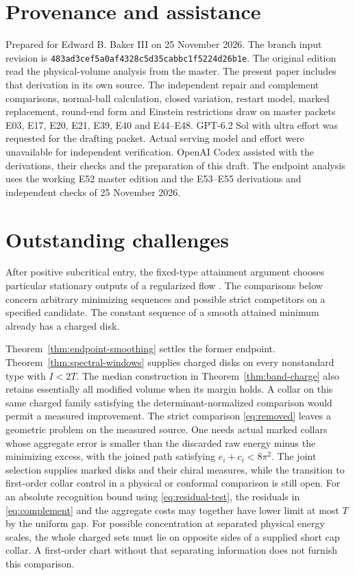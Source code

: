 \documentclass[11pt,letterpaper]{article}
\numberwithin{equation}{section}
\theoremstyle{remark}
\begin{document}




\section*{Provenance and assistance}

Prepared for Edward B. Baker III on 25 November 2026.
The branch input revision is
\texttt{483ad3cef5a0af4328c5d35cabbc1f5224d26b1e}.
The original edition read the physical-volume analysis from the master.
The present paper includes that derivation in its own source. The independent repair and complement comparisons,
normal-ball calculation, closed variation, restart model,
marked replacement, round-end form and Einstein restrictions
draw on master packets E03, E17, E20, E21, E39, E40 and
E44--E48. GPT-6.2 Sol with ultra effort was requested for
the drafting packet. Actual serving model and effort were
unavailable for independent verification. OpenAI Codex
assisted with the derivations, their checks and the preparation
of this draft. The endpoint analysis uses the working E52 master edition and the E53--E55 derivations and independent checks of 25 November 2026.

\section{Outstanding challenges}

After positive subcritical entry, the fixed-type attainment argument
chooses particular stationary outputs of a regularized flow
\cite{Baker2026BourAttainment}. The comparisons below concern
arbitrary minimizing sequences and possible strict competitors on
a specified candidate. The constant sequence of a smooth attained
minimum already has a charged disk.

Theorem~\ref{thm:endpoint-smoothing} settles the former endpoint.
Theorem~\ref{thm:spectral-windows} supplies charged disks on every nonstandard type with
\(I<2T\). The median construction in Theorem~\ref{thm:band-charge}
also retains essentially all modified volume when its margin holds. A collar on this same charged family satisfying the
determinant-normalized comparison would permit a measured improvement.
The strict comparison \eqref{eq:removed} leaves a geometric
problem on the measured source. One needs actual marked collars
whose aggregate error is smaller than the discarded raw energy
minus the minimizing excess, with the joined path satisfying
\(e_i+c_i<8\pi^2\). The joint selection supplies
marked disks and their chiral measures, while the transition to
first-order collar control in a physical or conformal comparison
is still open. For an absolute recognition bound using
\eqref{eq:residual-test}, the residuals in \eqref{eq:complement}
and the aggregate costs may together have lower limit at most \(T\) by the uniform gap.
For possible concentration at separated physical energy scales,
the whole charged sets must lie on opposite sides of a supplied
short cap collar. A first-order chart without that separating
information does not furnish this comparison.
\end{document}
